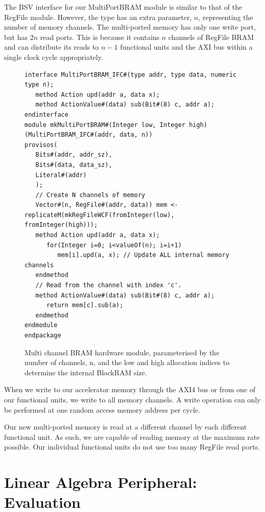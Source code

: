 \documentclass[a4paper,8pt]{report}
\begin{document}
The BSV interface for our MultiPortBRAM module is similar to that of the RegFile
module. However, the type has an extra parameter, $n$, representing the number of memory
channels. The multi-ported memory has only one write port, but has $2n$ read
ports. This is because it contains $n$ channels of RegFile BRAM and can
distribute its reads to $n-1$ functional units and the AXI bus within a single
clock cycle appropriately.

\begin{figure}[h]
  \centering
\scriptsize
\begin{BVerbatim}
interface MultiPortBRAM_IFC#(type addr, type data, numeric type n);
   method Action upd(addr a, data x);
   method ActionValue#(data) sub(Bit#(8) c, addr a);
endinterface
module mkMultiPortBRAM#(Integer low, Integer high)(MultiPortBRAM_IFC#(addr, data, n))
provisos(
   Bits#(addr, addr_sz),
   Bits#(data, data_sz),
   Literal#(addr)
   );
   // Create N channels of memory
   Vector#(n, RegFile#(addr, data)) mem <- replicateM(mkRegFileWCF(fromInteger(low), fromInteger(high)));
   method Action upd(addr a, data x);
      for(Integer i=0; i<valueOf(n); i=i+1)
         mem[i].upd(a, x); // Update ALL internal memory channels
   endmethod
   // Read from the channel with index 'c'.
   method ActionValue#(data) sub(Bit#(8) c, addr a);
      return mem[c].sub(a);
   endmethod
endmodule
endpackage
\end{BVerbatim}
\normalsize
\caption{Multi channel BRAM hardware module, parameterised by the number of
  channels, n, and the low and high allocation indices to determine the internal
BlockRAM size.}
\end{figure}
When we write to our accelerator memory through the AXI4 bus or from one of our
functional units, we write to all memory channels. A write operation can only be
performed at one random access memory address per cycle.

Our new multi-ported memory is read at a different channel by each different
functional unit. As such, we are capable of reading memory at the maximum rate
possible. Our individual functional units do not use too many RegFile read ports.



\chapter{Linear Algebra Peripheral: Evaluation}
\end{document}
